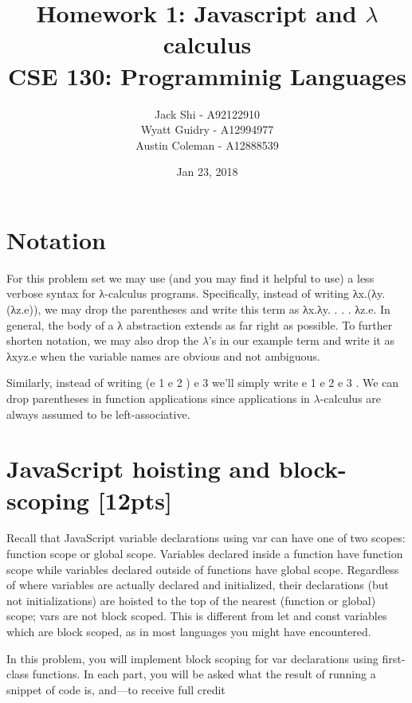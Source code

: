\documentclass{article}
\title{
	Homework 1: Javascript and $\lambda$ calculus \\
	\large CSE 130: Programminig Languages
}
\date{Jan 23, 2018}
\author{
	Jack Shi - A92122910 \\
	Wyatt Guidry - A12994977\\
	Austin Coleman - A12888539 }
\begin{document}
\maketitle

\section*{Notation}
For this problem set we may use (and you may find it helpful to use) a less
verbose syntax for λ-calculus
programs. Specifically, instead of writing λx.(λy.(λz.e)), we may drop the
parentheses and write this term as
λx.λy. . . . λz.e. In general, the body of a λ abstraction extends as far right
as possible. To further shorten
notation, we may also drop the $\lambda$’s in our example term and write it as λxyz.e
when the variable names are
obvious and not ambiguous.
\par Similarly, instead of writing (e 1 e 2 ) e 3 we’ll simply write e 1 e 2 e 3 . We
can drop parentheses in function
applications since applications in $\lambda$-calculus are always assumed to be
left-associative.

\section{JavaScript hoisting and block-scoping [12pts]}
Recall that JavaScript variable declarations using var can have one of two
scopes: function scope or global
scope. Variables declared inside a function have function scope while variables
declared outside of functions
have global scope. Regardless of where variables are actually declared and
initialized, their declarations (but
not initializations) are hoisted to the top of the nearest (function or global)
scope; vars are not block scoped.
This is different from let and const variables which are block scoped, as in
most languages you might have
encountered.
\par In this problem, you will implement block scoping for var declarations using
first-class functions. In each
part, you will be asked what the result of running a snippet of code is, and—to
receive full credit \\
\end{document}
